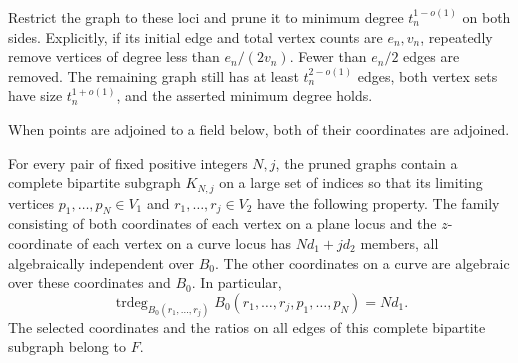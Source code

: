 Restrict the graph to these loci and prune it to minimum degree
\(t_n^{1-o(1)}\) on both sides. Explicitly, if its initial edge and total
vertex counts are \(e_n,v_n\), repeatedly remove vertices of degree less
than \(e_n/(2v_n)\). Fewer than \(e_n/2\) edges are removed. The
remaining graph still has at least \(t_n^{2-o(1)}\) edges, both vertex sets have size
\(t_n^{1+o(1)}\), and the asserted minimum degree holds.

When points are adjoined to a field below, both of their coordinates
are adjoined.

\begin{lemma}
\label{alg:generic-grid}
For every pair of fixed positive integers \(N,j\), the pruned graphs
contain a complete bipartite subgraph \(K_{N,j}\) on a large set of indices
so that its limiting vertices
\(p_1,\ldots,p_N\in V_1\) and \(r_1,\ldots,r_j\in V_2\) have the
following property. The family consisting of both coordinates of each
vertex on a plane locus and the \(z\)-coordinate of each vertex on a
curve locus has \(Nd_1+jd_2\) members, all algebraically independent
over \(B_0\).
The other coordinates on a curve are algebraic over these coordinates
and \(B_0\). In particular,
\begin{equation}\label{alg:joint-degree}
 \operatorname{trdeg}_{B_0(r_1,\ldots,r_j)}
       B_0(r_1,\ldots,r_j,p_1,\ldots,p_N)=Nd_1.
\end{equation}
The selected coordinates and the ratios on all edges of this complete bipartite subgraph
belong to \(F\).
\end{lemma}

